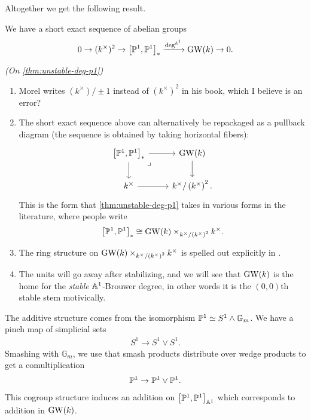 \documentclass[11pt,openany]{book}
\let\smashprod\wedge
\begin{document}
Altogether we get the following result.

\begin{theorem}\label{thm:unstable-deg-p1} 
\cite[7.36]{Morel} We have a short exact sequence of abelian groups
\begin{equation}\label{eqn:unstable-deg-p1}
\begin{aligned}
    0 \to (k^\times)^2 \to \left[ \P^1,\P^1 \right]_\ast \xto{\deg^{\A^1}} \GW(k) \to 0.
\end{aligned}
\end{equation}
\end{theorem}

\begin{remark} \textit{(On \autoref{thm:unstable-deg-p1})}
\begin{enumerate}
    \item Morel writes $(k^\times)/\pm1$ instead of $(k^\times)^2$ in his book, which I believe is an error?
    \item The short exact sequence above can alternatively be repackaged as a pullback diagram (the sequence is obtained by taking horizontal fibers):
    \[ \begin{tikzcd}
    {\left[ \P^1,\P^1 \right]_\ast}\rar\dar\pb & \GW(k)\dar\\
    k^\times\rar & k^\times / \left( k^\times \right)^2.
\end{tikzcd} \]
    This is the form that \autoref{thm:unstable-deg-p1} takes in various forms in the literature, where people write
    \begin{align*}
        \left[ \P^1,\P^1 \right]_\ast \cong \GW(k) \times_{k^\times / \left( k^\times \right)^2} k^\times.
    \end{align*}
    \item The ring structure on $\GW(k) \times_{k^\times / \left( k^\times \right)^2} k^\times$ is spelled out explicitly in \cite{Cazanave-thesis}.

    \item The units will go away after stabilizing, and we will see that $\GW(k)$ is the home for the \textit{stable} $\A^1$-Brouwer degree, in other words it is the $(0,0)$th stable stem motivically.
\end{enumerate}
\end{remark}

The additive structure comes from the isomorphism $\P^1 \simeq S^1 \smashprod \mathbb{G}_m$. We have a pinch map of simplicial sets
\begin{align*}
    S^1 \to S^1\vee S^1.
\end{align*}
Smashing with $\mathbb{G}_m$, we use that smash products distribute over wedge products to get a comultiplication
\begin{align*}
    \P^1 \to \P^1 \vee \P^1.
\end{align*}
This cogroup structure induces an addition on $\left[ \P^1,\P^1 \right]_{\A^1}$ which corresponds to addition in $\GW(k)$.
\end{document}
